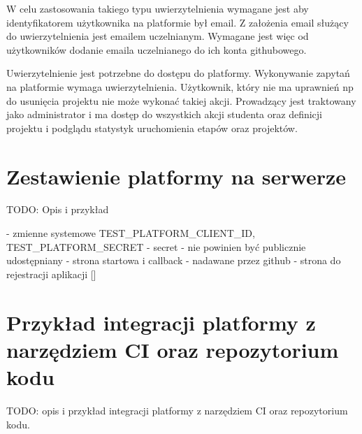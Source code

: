 W celu zastosowania takiego typu uwierzytelnienia wymagane jest aby identyfikatorem użytkownika na platformie był email.
Z założenia email służący do uwierzytelnienia jest emailem uczelnianym.
Wymagane jest więc od użytkowników dodanie emaila uczelnianego do ich konta githubowego.

Uwierzytelnienie jest potrzebne do dostępu do platformy.
Wykonywanie zapytań na platformie wymaga uwierzytelnienia.
Użytkownik, który nie ma uprawnień np do usunięcia projektu nie może wykonać takiej akcji.
Prowadzący jest traktowany jako administrator i ma dostęp do wszystkich akcji studenta oraz definicji projektu i podglądu statystyk uruchomienia etapów oraz projektów.

\section {Zestawienie platformy na serwerze}
\label{run-platform}

TODO: Opis i przykład

- zmienne systemowe TEST\_PLATFORM\_CLIENT\_ID, TEST\_PLATFORM\_SECRET
- secret - nie powinien być publicznie udostępniany
- strona startowa i callback
- nadawane przez github
- strona do rejestracji aplikacji []

\section {Przykład integracji platformy z narzędziem CI oraz repozytorium kodu}
\label{ci-integration}

TODO: opis i przykład integracji platformy z narzędziem CI oraz repozytorium
kodu.